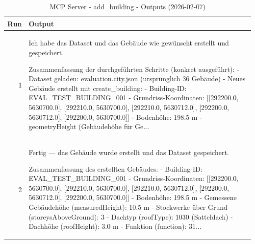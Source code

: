 \documentclass[a4paper,11pt]{article}
\begin{document}
\clearpage

\begin{table}[ht]
\centering
\scriptsize
\caption{MCP Server - add\_building - Outputs (2026-02-07)}
\label{tab:mcp\_add\_building\_outputs\_2026-02-07}
\begin{tabular}{r p{12cm}}
\hline
Run & Output \\
\hline
1 & Ich habe das Dataset und das Gebäude wie gewünscht erstellt und gespeichert.

Zusammenfassung der durchgeführten Schritte (konkret ausgeführt):
- Dataset geladen: evaluation.city.json (ursprünglich 36 Gebäude)
- Neues Gebäude erstellt mit create\_building:
  - Building-ID: EVAL\_TEST\_BUILDING\_001
  - Grundriss-Koordinaten: [[292200.0, 5630700.0], [292210.0, 5630700.0], [292210.0, 5630712.0], [292200.0, 5630712.0], [292200.0, 5630700.0]]
  - Bodenhöhe: 198.5 m
  - geometryHeight (Gebäudehöhe für Ge... \\
2 & Fertig — das Gebäude wurde erstellt und das Dataset gespeichert.

Zusammenfassung des erstellten Gebäudes:
- Building-ID: EVAL\_TEST\_BUILDING\_001
- Grundriss-Koordinaten: [[292200.0, 5630700.0], [292210.0, 5630700.0], [292210.0, 5630712.0], [292200.0, 5630712.0], [292200.0, 5630700.0]]
- Bodenhöhe: 198.5 m
- Gemessene Gebäudehöhe (measuredHeight): 10.5 m
- Stockwerke über Grund (storeysAboveGround): 3
- Dachtyp (roofType): 1030 (Satteldach)
- Dachhöhe (roofHeight): 3.0 m
- Funktion (function): 31... \\
\hline
\end{tabular}
\end{table}

\clearpage
\end{document}
